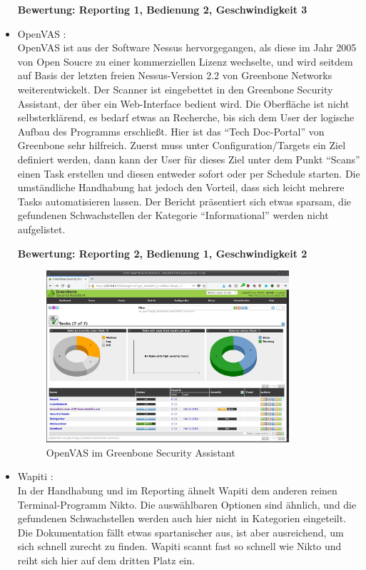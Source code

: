 \documentclass[12pt,oneside,a4paper,parskip]{scrbook}
\begin{document}
\begin{itemize}
            \textbf{Bewertung: Reporting 1, Bedienung 2, Geschwindigkeit 3}
          \item OpenVAS \cite{OpenVAS}:\\
            OpenVAS ist aus der Software Nessus hervorgegangen, als diese im Jahr 2005 von Open Soucre zu einer kommerziellen Lizenz wechselte, und wird seitdem auf Basis der letzten freien Nessus-Version 2.2 von Greenbone Networks weiterentwickelt. Der Scanner ist eingebettet in den Greenbone Security Assistant, der über ein Web-Interface bedient wird. Die Oberfläche ist nicht selbsterklärend, es bedarf etwas an Recherche, bis sich dem User der logische Aufbau des Programms erschließt. Hier ist das ``Tech Doc-Portal'' von Greenbone sehr hilfreich. Zuerst muss unter Configuration/Targets ein Ziel definiert werden, dann kann der User für dieses Ziel unter dem Punkt ``Scans'' einen Task erstellen und diesen entweder sofort oder per Schedule starten.
            Die umständliche Handhabung hat jedoch den Vorteil, dass sich leicht mehrere Tasks automatisieren lassen. Der Bericht präsentiert sich etwas sparsam, die gefundenen Schwachstellen der Kategorie ``Informational'' werden nicht aufgelistet.

            \textbf{Bewertung: Reporting 2, Bedienung 1, Geschwindigkeit 2}
            \begin{figure} [H]
              \centering
              \includegraphics[width=0.85\textwidth]{Images/OpenVAS}
              \caption[OpenVAS im Greenbone Security Assistant]{OpenVAS im Greenbone Security Assistant}
            \end{figure}
          \item Wapiti \cite{Wapiti}:\\
            In der Handhabung und im Reporting ähnelt Wapiti dem anderen reinen Terminal-Programm Nikto. Die auswählbaren Optionen sind ähnlich, und die gefundenen Schwachstellen werden auch hier nicht in Kategorien eingeteilt. Die Dokumentation fällt etwas spartanischer aus, ist aber ausreichend, um sich schnell zurecht zu finden. Wapiti scannt fast so schnell wie Nikto und reiht sich hier auf dem dritten Platz ein.


\end{itemize}
\end{document}

